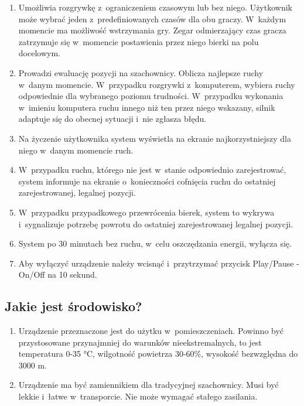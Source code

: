 \documentclass[12pt]{article}
\begin{document}
\begin{enumerate}
    \item Umożliwia rozgrywkę z ograniczeniem czasowym lub bez niego. Użytkownik może wybrać jeden z predefiniowanych czasów dla obu graczy. W każdym momencie ma możliwość wstrzymania gry. Zegar odmierzający czas gracza zatrzymuje się w momencie postawienia przez niego bierki na polu docelowym.
    \item Prowadzi ewaluację pozycji na szachownicy. Oblicza najlepsze ruchy w danym momencie. W przypadku rozgrywki z komputerem, wybiera ruchy odpowiednie dla wybranego poziomu trudności. W przypadku wykonania w imieniu komputera ruchu innego niż ten przez niego wskazany, silnik adaptuje się do obecnej sytuacji i nie zgłasza błędu.
    \item Na życzenie użytkownika system wyświetla na ekranie najkorzystniejszy dla niego w danym momencie ruch.
    \item W przypadku ruchu, którego nie jest w stanie odpowiednio zarejestrować, system informuje na ekranie o konieczności cofnięcia ruchu do ostatniej zarejestrowanej, legalnej pozycji.
    \item W przypadku przypadkowego przewrócenia bierek, system to wykrywa i sygnalizuje potrzebę powrotu do ostatniej zarejestrowanej legalnej pozycji.
    \item System po 30 minutach bez ruchu, w celu oszczędzania energii, wyłącza się.
    \item Aby wyłączyć urządzenie należy wcisnąć i przytrzymać przycisk Play/Pause - On/Off na 10 sekund.
\end{enumerate}

\subsection{Jakie jest środowisko?}
\begin{enumerate}
\item Urządzenie przeznaczone jest do użytku w pomieszczeniach. Powinno być przystosowane przynajmniej do warunków nieekstremalnych, to jest temperatura 0-35 °C, wilgotność powietrza 30-60\%, wysokość bezwzględna do 3000 m. 
\item Urządzenie ma być zamiennikiem dla tradycyjnej szachownicy. Musi być lekkie i łatwe w transporcie. Nie może wymagać stałego zasilania.
\end{enumerate}
\end{document}
